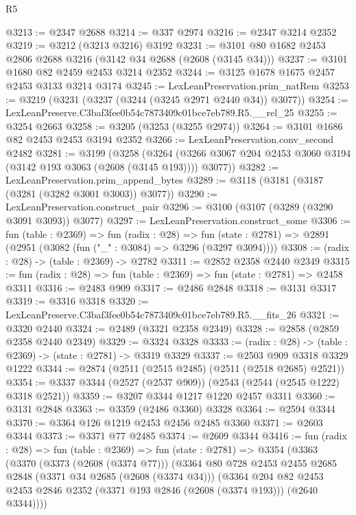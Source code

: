 \begin{lexlean}{R5}
\begin{coremodule}
@3213 := @2347 @2688
@3214 := @337 @2974
@3216 := @2347 @3214 @2352
@3219 := @3212 (@3213 @3216) @3192
@3231 := @3101 @80 @1682 @2453 @2806 @2688 @3216 (@3142 @34 @2688 (@2608 (@3145 @34)))
@3237 := @3101 @1680 @82 @2459 @2453 @3214 @2352
@3244 := @3125 @1678 @1675 @2457 @2453 @3133 @3214 @3174
@3245 := LexLeanPreservation.prim_natRem
@3253 := @3219 (@3231 (@3237 (@3244 (@3245 @2971 @2440 @34)) @3077))
@3254 := LexLeanPreserve.C3baf3fee0b54c7873409c01bce7eb789.R5.__rel_25
@3255 := @3254 @2663
@3258 := @3205 (@3253 (@3255 @2974))
@3264 := @3101 @1686 @82 @2453 @2453 @3194 @2352
@3266 := LexLeanPreservation.conv_second @2482
@3281 := @3199
    (@3258
      (@3264 (@3266 @3067 @204 @2453 @3060 @3194 (@3142 @193 @3063 (@2608 (@3145 @193)))) @3077))
@3282 := LexLeanPreservation.prim_append_bytes
@3289 := @3118 (@3181 (@3187 (@3281 (@3282 @3001 @3003)) @3077))
@3290 := LexLeanPreservation.construct_pair
@3296 := @3100 (@3107 (@3289 (@3290 @3091 @3093)) @3077)
@3297 := LexLeanPreservation.construct_some
@3306 := fun (table : @2369) =>
  fun (radix : @28) =>
  fun (state : @2781) => @2891 (@2951 (@3082 (fun ("_" : @3084) => @3296 (@3297 @3094))))
@3308 := (radix : @28) -> (table : @2369) -> @2782
@3311 := @2852 @2358 @2440 @2349
@3315 := fun (radix : @28) => fun (table : @2369) => fun (state : @2781) => @2458 @3311
@3316 := @2483 @909
@3317 := @2486 @2848
@3318 := @3131 @3317
@3319 := @3316 @3318
@3320 := LexLeanPreserve.C3baf3fee0b54c7873409c01bce7eb789.R5.__fits_26
@3321 := @3320 @2440
@3324 := @2489 (@3321 @2358 @2349)
@3328 := @2858 (@2859 @2358 @2440 @2349)
@3329 := @3324 @3328
@3333 := (radix : @28) -> (table : @2369) -> (state : @2781) -> @3319 @3329
@3337 := @2503 @909 @3318 @3329 @1222
@3344 := @2874 (@2511 (@2515 @2485) (@2511 (@2518 @2685) @2521))
@3354 := @3337 @3344 (@2527 (@2537 @909)) (@2543 (@2544 (@2545 @1222) @3318 @2521))
@3359 := @3207 @3344 @1217 @1220 @2457 @3311
@3360 := @3131 @2848
@3363 := @3359 (@2486 @3360) @3328
@3364 := @2594 @3344
@3370 := @3364 @126 @1219 @2453 @2456 @2485 @3360
@3371 := @2603 @3344
@3373 := @3371 @77 @2485
@3374 := @2609 @3344
@3416 := fun (radix : @28) =>
  fun (table : @2369) =>
  fun (state : @2781) =>
  @3354
    (@3363
      (@3370
        (@3373 (@2608 (@3374 @77)))
        (@3364
          @80
          @728
          @2453
          @2455
          @2685
          @2848
          (@3371 @34 @2685 (@2608 (@3374 @34)))
          (@3364
            @204
            @82
            @2453
            @2453
            @2846
            @2352
            (@3371 @193 @2846 (@2608 (@3374 @193)))
            (@2640 @3344))))

\end{coremodule}
\end{lexlean}
